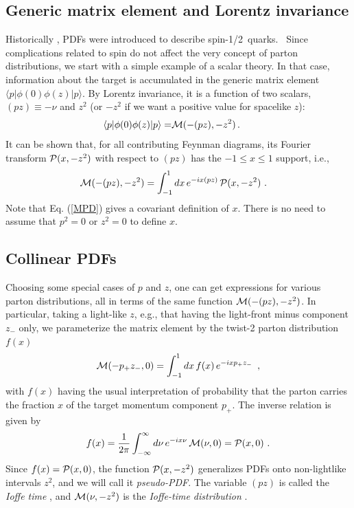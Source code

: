 \documentclass[aps,prd,twocolumn,showpacs,preprintnumbers,superscriptaddress,groupedaddress]{revtex4-1}
\begin{document}
  





  \subsection{Generic matrix element  and 
Lorentz invariance} 

  Historically  \cite{Feynman:1973xc},  PDFs were  introduced
  to describe  \mbox{spin-1/2 quarks. }
Since  complications related to spin
 do not affect  
  the very concept of parton distributions,  we  start with 
  a simple example of a  scalar  theory.
In that case,  information about the target is accumulated 
in the generic matrix element $\langle  p | \phi (0)  \phi(z)  | p \rangle $.
By Lorentz invariance, it is a function of two scalars, $(pz) \equiv - \nu$ and $z^2$
(or $-z^2$ if we want a positive value  for spacelike $z$):
  \begin{align}
  \langle p |   \phi(0) \phi (z)|p \rangle %
=  & {\cal M} (-(pz), -z^2) 
\,  .
 \
 \label{lorentz}
\end{align} 
 It can be shown \cite{Radyushkin:2016hsy,Radyushkin:1983wh}    that, for all contributing  Feynman diagrams,   
 its  Fourier transform  ${\cal P} (x, -z^2)$ with respect to $(pz)$ 
 has the $-1 \leq x \leq 1$ support, i.e., 
   \begin{align}
 {\cal M} (-(pz), -z^2) 
&   = 
 \int_{-1}^1 dx 
 \, e^{-i x (pz) } \,  {\cal P} (x, -z^2)  \   .
  \label{MPD}
\end{align}   
  Note that  Eq. (\ref{MPD})   gives a covariant definition of $x$.  
   There is no need to assume that 
$p^2=0$ or $z^2=0$ to define $x$. 
 
 \subsection{Collinear   PDFs}
 
Choosing 
some special cases  of $p$ and $z$, one can  get expressions for various parton distributions,
all in terms of the same function  ${\cal M} (-(pz), -z^2)$. 
In particular, taking  a light-like  $z$, e.g., that  
having  the light-front minus component $z_-$  only, we   
parameterize the matrix element  by  the twist-2 parton distribution $f(x)$ 
  \begin{align}
  {\cal M} (-p_+ z_- , 0)  =
   \int_{-1}^1 dx \, f(x) \, 
e^{-ixp_+ z_-} \,  \   ,  
 \label{twist2par0}
\end{align}
with $f(x)$ having  the usual interpretation of  probability that 
the parton carries  the fraction $x$ of the target momentum 
component $p_+$.  
The inverse relation is given by 
\begin{align} 
 f  (x)  =\frac{1}{2 \pi}  \int_{-\infty}^{\infty}  d\nu \, e^{-i x \nu}  \, {\cal M}(\nu , 0)    = {\cal P} (x, 0) 
  \  .
\label{fxMnu}
\end{align}  
Since $f(x) =   {\cal P} (x, 0) $, the function $ {\cal P} (x, -z^2) $ generalizes 
PDFs onto non-lightlike intervals $z^2$, and we will call it 
 {\it pseudo-PDF}.  The variable $(pz)$ is called 
 the {\it Ioffe time} \cite{Ioffe:1969kf}, 
and   ${\cal M}(\nu , -z^2) $  is    the {\it Ioffe-time distribution} \cite{Braun:1994jq}. 
\end{document}
